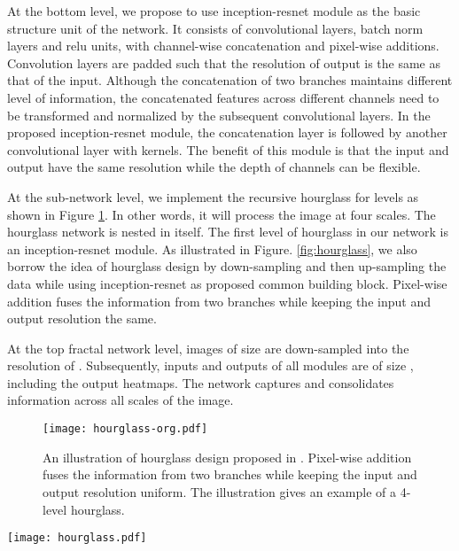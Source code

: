 \documentclass[journal ]{IEEEtran}
\begin{document}
At the bottom level, we propose to use inception-resnet module as the basic structure unit of the network. It consists of convolutional layers, batch norm layers and relu units, with channel-wise concatenation and pixel-wise additions.
Convolution layers are padded such that the resolution of output is the same as that of the input. 
Although the concatenation of two branches maintains different level of information, the concatenated features across different channels need to be transformed and normalized by the subsequent convolutional layers. In the proposed inception-resnet module, the concatenation layer is followed by another convolutional layer with  kernels. 
The benefit of this module is that the input and output have the same resolution while the depth of channels can be flexible. 

At the sub-network level, we implement the recursive hourglass for  levels as shown in Figure \ref{fig:hourglass-org}. In other words, it will process the image at four scales. The hourglass network is nested in itself. The first level of hourglass in our network is an inception-resnet module.
As illustrated in Figure. \ref{fig:hourglass}, we also borrow the idea of hourglass design by down-sampling and then up-sampling the data while using inception-resnet as proposed common building block. 
Pixel-wise addition fuses the information from two branches while keeping the input and output resolution the same.

At the top fractal network level, images of size  are down-sampled into the resolution of . Subsequently, inputs and outputs of all modules are of size , including the output heatmaps. 
The network captures and consolidates information across all scales of the image. 

\begin{figure}
	\begin{center}
		\texttt{[image: hourglass-org.pdf]}
	\end{center}
	\caption{An illustration of hourglass design proposed in \cite{newell2016stacked}. Pixel-wise addition fuses the information from two branches while keeping the input and output resolution uniform. The illustration gives an example of a 4-level hourglass.}
	\label{fig:hourglass-org}
\end{figure}

\begin{figure*}
	\begin{center}
		\texttt{[image: hourglass.pdf]}
	\end{center}
	\caption{\textbf{Improved hourglass sub-network}. While using inception-resnet as proposed common building block, we borrow the idea of hourglass design by down-sampling and then up-sampling the dataflow in one branch, maintaining the resolution of the other branch. The lowest level of the recursive hourglass in our network is an inception-resnet module.}
	\label{fig:hourglass}
\end{figure*}
\end{document}
